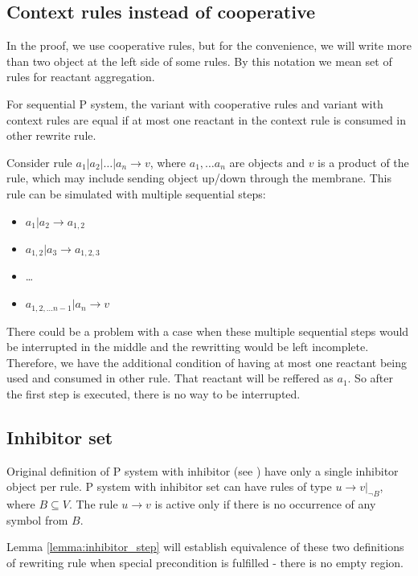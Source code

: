 \subsection{Context rules instead of cooperative}
  In the proof, we use cooperative rules, but for the convenience, we will write more than two object at the left side of some rules. By this notation we mean set of rules for reactant aggregation.
  \begin{lema}
  \label{lemma:context_rules}
    For sequential P system, the variant with cooperative rules and variant with context rules are equal if at most one reactant in the context rule is consumed in other rewrite rule.
  \end{lema}
  \begin{dokaz}
    Consider rule $a_1|a_2|\dots|a_n \rightarrow v$, where $a_1,\dots a_n$ are objects and $v$ is a product of the rule, which may include sending object up/down through the membrane.
    This rule can be simulated with multiple sequential steps:
    \begin{itemize}
      \item $a_1|a_2 \rightarrow a_{1,2}$
      \item $a_{1,2}|a_3 \rightarrow a_{1,2,3}$
      \item \dots
      \item $a_{1,2,\dots n-1}|a_n \rightarrow v$
    \end{itemize}    
  \end{dokaz}
  There could be a problem with a case when these multiple sequential steps would be interrupted in the middle and the rewritting would be left incomplete. Therefore, we have the additional condition of having at most one reactant being used and consumed in other rule. That reactant will be reffered as $a_1$. So after the first step is executed, there is no way to be interrupted.

\subsection{Inhibitor set}
Original definition of P system with inhibitor (see \cite{Ionescu:jucs_10_5:on_p_systems_with}) have only a single inhibitor object per rule. P system with inhibitor set can have rules of type $u\rightarrow v|_{\neg B}$, where $B\subseteq V$. The rule $u\rightarrow v$ is active only if there is no occurrence of any symbol from $B$.

Lemma \ref{lemma:inhibitor_step} will establish equivalence of these two definitions of rewriting rule when special precondition is fulfilled - there is no empty region.

